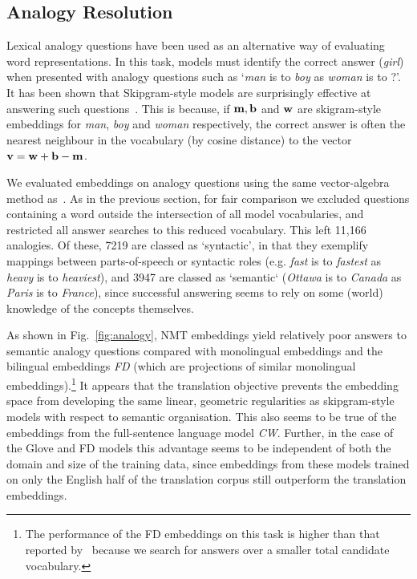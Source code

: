 \documentclass{article} %
\begin{document}
\subsection{Analogy Resolution}

Lexical analogy questions have been used as an alternative way of evaluating word representations. In this task, models must identify the correct answer (\emph{girl}) when presented with analogy questions such as `\emph{man} is to \emph{boy} as \emph{woman} is to ?'. It has been shown that Skipgram-style models are surprisingly effective at answering such questions~\citep{mikolov2013distributed}. This is because, if \( \bf m, b \) and \( \bf w\) are skigram-style embeddings for \emph{man}, \emph{boy} and \emph{woman} respectively, the correct answer is often the nearest neighbour in the vocabulary (by cosine distance) to the vector \( \bf v = w + b - m \). 

We evaluated embeddings on analogy questions using the same vector-algebra method as~\citet{mikolov2013distributed}. As in the previous section, for fair comparison we excluded questions containing a word outside the intersection of all model vocabularies, and restricted all answer searches to this reduced vocabulary. This left 11,166 analogies. Of these, 7219 are classed as `syntactic', in that they exemplify mappings between parts-of-speech or syntactic roles (e.g. \emph{fast} is to \emph{fastest} as \emph{heavy} is to \emph{heaviest}), and 3947 are classed as `semantic` (\emph{Ottawa} is to \emph{Canada} as \emph{Paris} is to \emph{France}), since successful answering seems to rely on some (world) knowledge of the concepts themselves. 

As shown in Fig.~\ref{fig:analogy}, NMT embeddings yield relatively poor answers to semantic analogy questions compared with monolingual embeddings and the bilingual embeddings \emph{FD} (which are projections of similar monolingual embeddings).\footnote{The performance of the FD embeddings on this task is higher than that reported by~\cite{faruqui2014improving} because we search for answers over a smaller total candidate vocabulary.} It appears that the translation objective prevents the embedding space from developing the same linear, geometric regularities as skipgram-style models with respect to semantic organisation. This also seems to be true of the embeddings from the full-sentence language model \emph{CW}. Further, in the case of the Glove and FD models this advantage seems to be independent of both the domain and size of the training data, since embeddings from these models trained on only the English half of the translation corpus still outperform the translation embeddings. 
\end{document}
